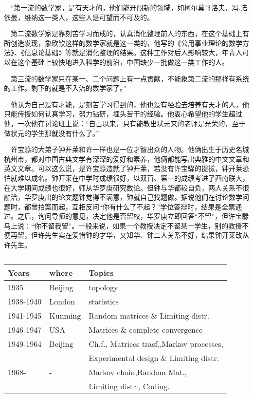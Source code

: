 $\quad$“第一流的数学家，是有天才的，他们能开闯新的领域，如柯尔莫哥洛夫，冯.诺依曼，维纳这一类人，这些人是可望而不可及的。

$\quad$第二流数学家是靠刻苦学习而成的，认真消化整理前人的东西，在这个基础上有所创造发现，象欣钦这样的数学家就是这一类的，他写的《公用事业理论的数学方法》、《信息论基础》等就是消化整理的结果。这种工作对后人影响较大，年青人可以在这个基础上较快地进入科学的前沿，中国缺少一批做这一类工作的人。

$\quad$第三流的数学家只在某一、二个问题上有一点贡献，不能象第二流的那样有系统的工作。剩下的就是不入流的数学家了。”

$\quad$他认为自己没有才能，是刻苦学习得到的，他也没有经验去培养有天才的人，他只能传授如何认真学习，努力钻研，埋头苦干的经验。他衷心希望他的学生超过他，一次他在讨论班上说：“自古以来，只有能教出状元来的老师是光荣的，至于做状元的学生那就没有什么了。”

$\quad$许宝騄的大弟子钟开莱和许一样也是一位才智出众的人物。他俩出生于历史名城杭州市，都对中国古典文学有深深的爱好和素养，他俩都能写出典雅的中文文章和英文文章。可以这么说，是许宝騄造就了钟开莱，若没有许宝騄的提拔，钟开莱恐怕就难以成名。钟开莱在中学时成绩很好，以双百、第一的成绩考进了西南联大，在大学期间成绩也很好，师从华罗庚研究数论。但钟与华都较自负，两人关系不很融洽，华罗庚出的论文题钟觉得不满意，钟就自己找题做。据说他们在讨论数学问题时，都曾拍案而起，互相反问“你有什么了不起？”学位答辩时，结果是全票通过。之后，询问导师的意见，决定他是否留校，华罗庚立即回答“不留”，但许宝騄马上说：“你不留我留”。一般来说，如果一个教授决定不留某一学生，别的教授不便再留，但许先生实在爱惜钟的才华，又知华、钟二人关系不好，结果钟开莱改从许先生。


$\quad$\begin{tabular}{|l|l|l|}
	\hline Years & where & Topics  \\
	\hline 1935 & Beijing & topology \\
	\hline 1938-1940 & London & statistics\\
	\hline 1941-1945 & Kunming & Random matrices \& Limiting distr.\\
	\hline 1946-1947 & USA & Matrices \& complete convergence \\
	\hline 1949-1964 & Beijing & Ch.f., Matrices trasf.,Markov processes, \\
	\hline & &  Experimental design \& Limiting distr. \\
	\hline 1968- & - & Markov chain,Random Mat.,\\
	\hline & & Limiting distr., Coding. \\
	\hline
\end{tabular}


